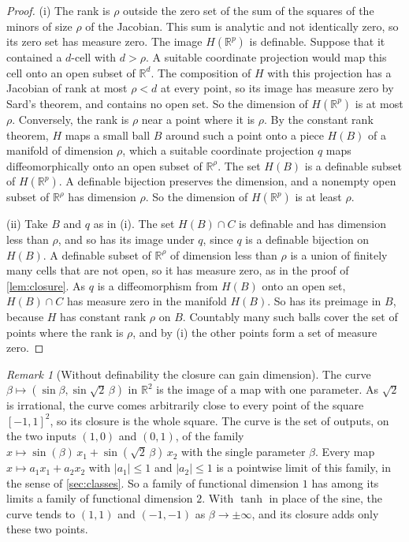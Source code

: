 \documentclass[10pt]{article}
\theoremstyle{definition}
\theoremstyle{remark}
\newtheorem{remark}[theorem]{Remark}
\newcommand{\R}{\mathbb{R}}
\begin{document}
\begin{proof}
(i) The rank is $\rho$ outside the zero set of the sum of the squares of the minors of size $\rho$ of the Jacobian. This sum is analytic and not identically zero, so its zero set has measure zero. The image $H(\R^p)$ is definable. Suppose that it contained a $d$-cell with $d > \rho$. A suitable coordinate projection would map this cell onto an open subset of $\R^d$. The composition of $H$ with this projection has a Jacobian of rank at most $\rho < d$ at every point, so its image has measure zero by Sard's theorem, and contains no open set. So the dimension of $H(\R^p)$ is at most $\rho$. Conversely, the rank is $\rho$ near a point where it is $\rho$. By the constant rank theorem, $H$ maps a small ball $B$ around such a point onto a piece $H(B)$ of a manifold of dimension $\rho$, which a suitable coordinate projection $q$ maps diffeomorphically onto an open subset of $\R^\rho$. The set $H(B)$ is a definable subset of $H(\R^p)$. A definable bijection preserves the dimension, and a nonempty open subset of $\R^\rho$ has dimension $\rho$. So the dimension of $H(\R^p)$ is at least $\rho$.

(ii) Take $B$ and $q$ as in (i). The set $H(B) \cap C$ is definable and has dimension less than $\rho$, and so has its image under $q$, since $q$ is a definable bijection on $H(B)$. A definable subset of $\R^\rho$ of dimension less than $\rho$ is a union of finitely many cells that are not open, so it has measure zero, as in the proof of \cref{lem:closure}. As $q$ is a diffeomorphism from $H(B)$ onto an open set, $H(B) \cap C$ has measure zero in the manifold $H(B)$. So has its preimage in $B$, because $H$ has constant rank $\rho$ on $B$. Countably many such balls cover the set of points where the rank is $\rho$, and by (i) the other points form a set of measure zero.
\end{proof}

\begin{remark}[Without definability the closure can gain dimension]\label{rem:sine}
The curve $\beta \mapsto (\sin\beta, \sin\sqrt2\,\beta)$ in $\R^2$ is the image of a map with one parameter. As $\sqrt2$ is irrational, the curve comes arbitrarily close to every point of the square $[-1, 1]^2$, so its closure is the whole square. The curve is the set of outputs, on the two inputs $(1, 0)$ and $(0, 1)$, of the family $x \mapsto \sin(\beta)\,x_1 + \sin(\sqrt2\,\beta)\,x_2$ with the single parameter $\beta$. Every map $x \mapsto a_1x_1 + a_2x_2$ with $\lvert a_1\rvert \le 1$ and $\lvert a_2\rvert \le 1$ is a pointwise limit of this family, in the sense of \cref{sec:classes}. So a family of functional dimension $1$ has among its limits a family of functional dimension $2$. With $\tanh$ in place of the sine, the curve tends to $(1, 1)$ and $(-1, -1)$ as $\beta \to \pm\infty$, and its closure adds only these two points.
\end{remark}
\end{document}
